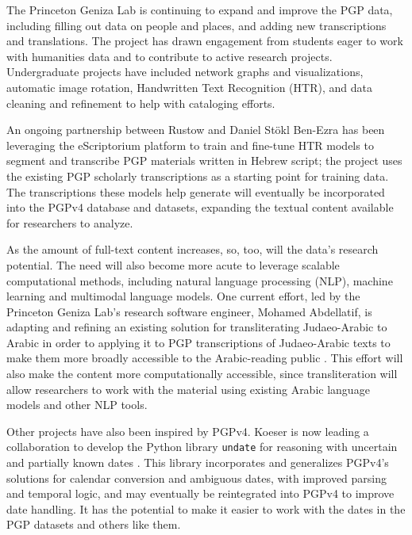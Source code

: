 \documentclass{article}
\begin{document}
The Princeton Geniza Lab is continuing to expand and improve the PGP data, including filling out data on people and places, and adding new transcriptions and translations. The project has drawn engagement from students eager to work with humanities data and to contribute to active research projects. Undergraduate projects have included network graphs and visualizations, automatic image rotation, Handwritten Text Recognition (HTR), and data cleaning and refinement to help with cataloging efforts. 

An ongoing partnership between Rustow and Daniel Stökl Ben-Ezra \autocite{noauthor_handwritten_nodate} has been leveraging the eScriptorium platform to train and fine-tune HTR models to segment and transcribe PGP materials written in Hebrew script; the project uses the existing PGP scholarly transcriptions as a starting point for training data. The transcriptions these models help generate will eventually be incorporated into the PGPv4 database and datasets, expanding the textual content available for researchers to analyze.

As the amount of full-text content increases, so, too, will the data’s research potential. The need will also become more acute to leverage scalable computational methods, including natural language processing (NLP), machine learning and multimodal language models. One current effort, led by the Princeton Geniza Lab’s research software engineer, Mohamed Abdellatif, is adapting and refining an existing solution for transliterating Judaeo-Arabic to Arabic \autocite{weisberg_mitelman_code-switching_2024} in order to applying it to PGP transcriptions of Judaeo-Arabic texts to make them more broadly accessible to the Arabic-reading public \autocite{abdellatif_machine_2025}. This effort will also make the content more computationally accessible, since transliteration will allow researchers to work with the material using existing Arabic language models and other NLP tools.

Other projects have also been inspired by PGPv4. Koeser is now leading a collaboration to develop the Python library \texttt{undate} for reasoning with uncertain and partially known dates \autocite{koeser_undate_2024}. This library incorporates and generalizes PGPv4’s solutions for calendar conversion and ambiguous dates, with improved parsing and temporal logic, and may eventually be reintegrated into PGPv4 to improve date handling. It has the potential to make it easier to work with the dates in the PGP datasets and others like them.
\end{document}
